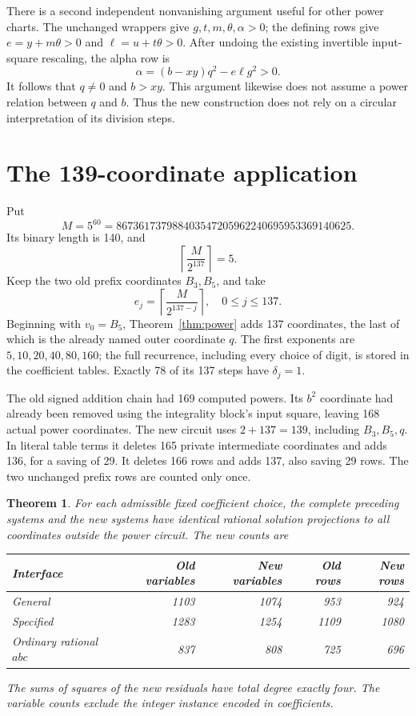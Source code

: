 \documentclass[11pt]{article}
\newtheorem{theorem}{Theorem}
\begin{document}
There is a second independent nonvanishing argument useful for other
power charts.  The unchanged wrappers give $g,t,m,\theta,\alpha>0$;
the defining rows give $e=y+m\theta>0$ and $\ell=u+t\theta>0$.
After undoing the existing invertible input-square rescaling, the
alpha row is
\[
 \alpha=(b-xy)q^2-e\ell g^2>0.
\]
It follows that $q\ne0$ and $b>xy$.  This argument likewise does not
assume a power relation between $q$ and $b$.  Thus the new construction
does not rely on a circular interpretation of its division steps.

\section{The 139-coordinate application}

Put
\[
 M=5^{60}=867361737988403547205962240695953369140625.
\]
Its binary length is 140, and
\[
 \left\lceil\frac{M}{2^{137}}\right\rceil=5.
\]
Keep the two old prefix coordinates $B_3,B_5$, and take
\[
 e_j=\left\lceil\frac{M}{2^{137-j}}\right\rceil,
 \quad 0\le j\le137.
\]
Beginning with $v_0=B_5$, Theorem~\ref{thm:power} adds 137 coordinates,
the last of which is the already named outer coordinate $q$.
The first exponents are $5,10,20,40,80,160$; the full recurrence,
including every choice of digit, is stored in the coefficient tables.
Exactly 78 of its 137 steps have $\delta_j=1$.

The old signed addition chain had 169 computed powers.  Its $b^2$
coordinate had already been removed using the integrality block's input
square, leaving 168 actual power coordinates.  The new circuit uses
$2+137=139$, including $B_3,B_5,q$.  In literal table terms it deletes
165 private intermediate coordinates and adds 136, for a saving of 29.
It deletes 166 rows and adds 137, also saving 29 rows.  The two unchanged
prefix rows are counted only once.

\begin{theorem}\label{thm:application}
For each admissible fixed coefficient choice, the complete preceding
systems and the new systems have identical rational solution projections
to all coordinates outside the power circuit.  The new counts are
\begin{center}
\begin{tabular}{lrrrr}
\toprule
Interface & Old variables & New variables & Old rows & New rows\\
\midrule
General &1103&1074&953&924\\
Specified &1283&1254&1109&1080\\
Ordinary rational $abc$ &837&808&725&696\\
\bottomrule
\end{tabular}
\end{center}
The sums of squares of the new residuals have total degree exactly four.
The variable counts exclude the integer instance encoded in coefficients.
\end{theorem}
\end{document}
